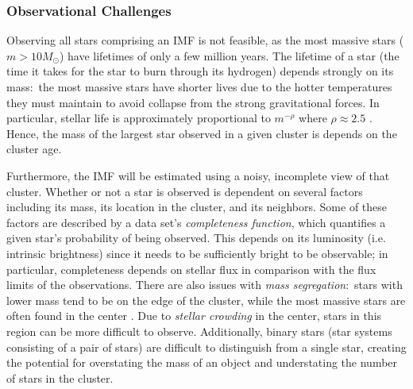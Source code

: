 \documentclass[12pt]{article}
\newcommand{\Msun}{M_{\odot}}
\begin{document}
\subsubsection{Observational Challenges} \label{sec:observational}
Observing all stars comprising an IMF 
is not feasible, as the most massive stars ($m > 10 \Msun$) have lifetimes of 
only a few million years.
The lifetime of a star (the time it takes for the star to burn through its
hydrogen) depends strongly on its mass:~the most massive
stars have shorter lives due to the hotter temperatures they must maintain
to avoid collapse from the strong gravitational forces. In particular,
stellar life is 
approximately proportional to $m^{-\rho}$ 
where $\rho \approx 2.5$ \citep[p. 28]{hansen2004}.
Hence, the mass of the largest star observed in a given 
cluster is depends on the cluster age.  %

Furthermore, the IMF will be estimated using a noisy, incomplete view of that cluster.  Whether or not a star is observed is dependent on several factors including its mass, its location in the cluster, and its neighbors.  Some of these factors are described by a data set's \emph{completeness function}, which quantifies a given star's probability of being observed.  This depends on its luminosity (i.e. intrinsic brightness) since it needs to be sufficiently bright to be observable; in particular, completeness depends on stellar flux in comparison with the flux limits of the observations.
There are also issues with {\it mass segregation}:~stars with lower mass tend to be on the edge of the cluster, while the most massive stars are often
found in the center \citep{weisz13}. Due to {\it stellar crowding} in the center, stars in this region can be more difficult to observe.  Additionally, binary stars (star systems consisting of a pair of stars) 
are difficult to distinguish from a single star, creating the potential for overstating the mass of an object and understating the number of stars in the cluster.
\end{document}
